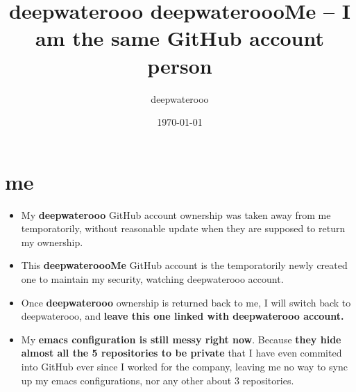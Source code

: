 \documentclass[9pt, b5paaper]{book}
\author{deepwaterooo}
\date{\today}
\title{deepwaterooo deepwateroooMe -- I am the same GitHub account person}
\begin{document}
\maketitle
\tableofcontents


\chapter{me}
\label{sec-1}
\begin{itemize}
\item My \textbf{deepwaterooo} GitHub account ownership was taken away from me temporatorily,
without reasonable update when they are supposed to return my
ownership.
\item This \textbf{deepwateroooMe} GitHub account is the temporatorily newly
created one to maintain my security, watching deepwaterooo account.
\item Once \textbf{deepwaterooo} ownership is returned back to me, I will switch
back to deepwaterooo, and \textbf{leave this one linked with deepwaterooo account.}
\item My \textbf{emacs configuration is still messy right now}. Because \textbf{they hide almost all the 5 repositories to be private} that I have even commited into GitHub
ever since I worked for the company, leaving me no way to sync up my
emacs configurations, nor any other about 3 repositories.
\end{itemize}
\end{document}
